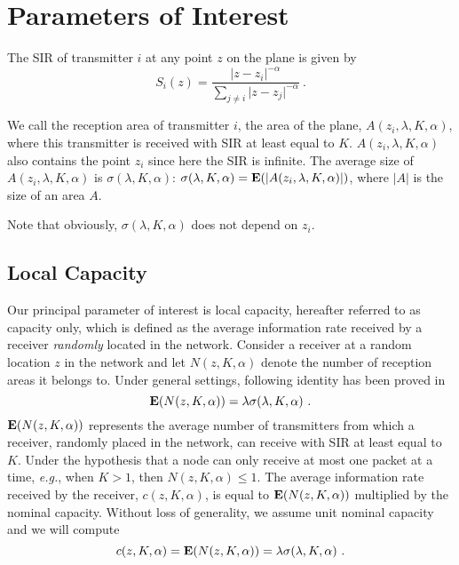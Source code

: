 \documentclass[12pt,english]{article}
\begin{document}
\section{Parameters of Interest}

The SIR of transmitter $i$ at any point $z$ on the plane is given by
\begin{equation}
S_i(z)=\frac{\vert  z-z_i\vert^{-\alpha}}{\sum_{j\neq i}\vert  z-z_j\vert^{-\alpha}}~.
\label{eq:sinr}
\end{equation} 

We call the reception area of transmitter $i$, the area of the plane, $A(z_i,\lambda,K,\alpha)$, where this transmitter is received with SIR at least equal to $K$. $A(z_i,\lambda,K,\alpha)$ also contains the point $z_{i}$ since here the SIR is infinite. The average size of $A(z_i,\lambda,K,\alpha)$ is $\sigma(\lambda,K,\alpha)$: $\sigma(\lambda,K,\alpha)={\bf E}(|A(z_i,\lambda,K,\alpha)|)$, where $|A|$ is the size of an area $A$. 

Note that obviously, $\sigma(\lambda,K,\alpha)$ does not depend on $z_i$.

\subsection{Local Capacity}

Our principal parameter of interest is local capacity, hereafter referred to as capacity only, which is defined as the average information rate received by a receiver {\em randomly} located in the network. Consider a receiver at a random location $z$ in the network and let $N(z,K,\alpha)$ denote the number of reception areas it belongs to. Under general settings, following identity has been proved in \cite{Jacquet:2009}
\begin{equation}
{\bf E}(N(z,K,\alpha))=\lambda\sigma(\lambda,K,\alpha)~.
\label{eq:avg_no}
\end{equation}
${\bf E}(N(z,K,\alpha))$ represents the average number of transmitters from which a receiver, randomly placed in the network, can receive with SIR at least equal to $K$. Under the hypothesis that a node can only receive at most one packet at a time, {\it e.g.}, when \mbox{$K>1$}, then \mbox{$N(z,K,\alpha)\le 1$}. The average information rate received by the receiver, $c(z,K,\alpha)$, is equal to ${\bf E}(N(z,K,\alpha))$ multiplied by the nominal capacity. Without loss of generality, we assume unit nominal capacity and we will compute 
\begin{equation}
c(z,K,\alpha)={\bf E}(N(z,K,\alpha))=\lambda\sigma(\lambda,K,\alpha)~. 
\label{eq:poisson_hand_over_no}
\end{equation}
\end{document}
